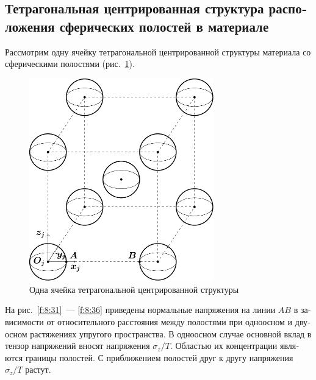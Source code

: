 \begin{russian}

\subsection{Тетрагональная центрированная структура расположения сферических полостей в материале}

Рассмотрим одну ячейку тетрагональной центрированной структуры материала со сферическими полостями (рис.~\ref{f:8:30}).

\begin{figure}[h!]
\centering
\includegraphics[width=8cm]{spheres-cav-9.pdf}
\caption{Одна ячейка тетрагональной центрированной структуры}
\label{f:8:30}
\end{figure}

На рис.~\ref{f:8:31}~--- \ref{f:8:36} приведены нормальные напряжения на линии $AB$ в зависимости от относительного расстояния между полостями при одноосном и двуосном растяжениях упругого пространства. В одноосном случае основной вклад в тензор напряжений вносят напряжения $\sigma_z/T$. Областью их концентрации являются границы полостей. С приближением полостей друг к другу напряжения $\sigma_z/T$ растут.


\end{russian}

